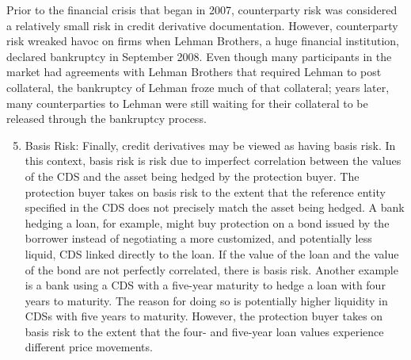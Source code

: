 \documentclass[11pt]{article}
\begin{document}
Prior to the financial crisis that began in 2007, counterparty risk was considered a relatively small risk in credit derivative documentation. However, counterparty risk wreaked havoc on firms when Lehman Brothers, a huge financial institution, declared bankruptcy in September 2008. Even though many participants in the market had agreements with Lehman Brothers that required Lehman to post collateral, the bankruptcy of Lehman froze much of that collateral; years later, many counterparties to Lehman were still waiting for their collateral to be released through the bankruptcy process.

\begin{enumerate}
  \setcounter{enumi}{4}
  \item Basis Risk: Finally, credit derivatives may be viewed as having basis risk. In this context, basis risk is risk due to imperfect correlation between the values of the CDS and the asset being hedged by the protection buyer. The protection buyer takes on basis risk to the extent that the reference entity specified in the CDS does not precisely match the asset being hedged. A bank hedging a loan, for example, might buy protection on a bond issued by the borrower instead of negotiating a more customized, and potentially less liquid, CDS linked directly to the loan. If the value of the loan and the value of the bond are not perfectly correlated, there is basis risk. Another example is a bank using a CDS with a five-year maturity to hedge a loan with four years to maturity. The reason for doing so is potentially higher liquidity in CDSs with five years to maturity. However, the protection buyer takes on basis risk to the extent that the four- and five-year loan values experience different price movements.
\end{enumerate}
\end{document}
